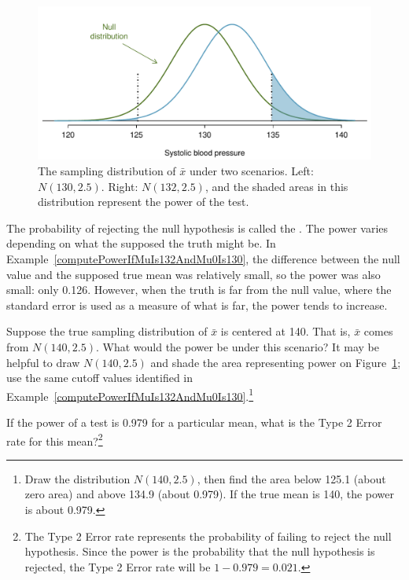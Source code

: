 \begin{figure}[ht]
\centering
\includegraphics[width=\textwidth]{ch_inference_foundations_oi_biostat/figures/power132And141/power132And141}
\caption{The sampling distribution of $\bar{x}$ under two scenarios. Left: $N(130, 2.5)$. Right: $N(132, 2.5)$, and the shaded areas in this distribution represent the power of the test.}
\label{power132And141}
\end{figure}

The probability of rejecting the null hypothesis is called the . The power varies depending on what the supposed the truth might be. In Example~\ref{computePowerIfMuIs132AndMu0Is130}, the difference between the null value and the supposed true mean was relatively small, so the power was also small: only 0.126. However, when the truth is far from the null value, where the standard error is used as a measure of what is far, the power tends to increase.

\begin{exercise}
Suppose the true sampling distribution of $\bar{x}$ is centered at 140. That is, $\bar{x}$ comes from $N(140, 2.5)$. What would the power be under this scenario? It may be helpful to draw $N(140, 2.5)$ and shade the area representing power on Figure~\ref{power132And141}; use the same cutoff values identified in Example~\ref{computePowerIfMuIs132AndMu0Is130}.\footnote{Draw the distribution $N(140, 2.5)$, then find the area below 125.1 (about zero area) and above 134.9 (about 0.979). If the true mean is 140, the power is about 0.979.}
\end{exercise}

\begin{exercise}
If the power of a test is 0.979 for a particular mean, what is the Type 2 Error rate for this mean?\footnote{The Type 2 Error rate represents the probability of failing to reject the null hypothesis. Since the power is the probability that the null hypothesis is rejected, the Type 2 Error rate will be $1-0.979 = 0.021$.}
\end{exercise}

